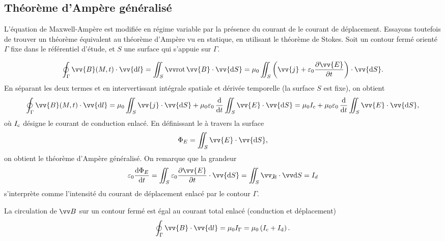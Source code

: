 \documentclass[12pt,fancy]{cours}
\begin{document}
\subsection{Théorème d'Ampère généralisé}
\label{subsubsec:ampère_généralisé}
L'équation de Maxwell-Ampère est modifiée en régime variable par la présence du courant de le courant de déplacement. Essayons toutefois de trouver un théorème équivalent au théorème d'Ampère vu en statique, en utilisant le théorème de Stokes. Soit un contour fermé orienté $\Gamma$ fixe dans le référentiel d'étude, et $S$ une surface qui s'appuie sur $\Gamma$.

\begin{equation}
\oint_{\Gamma}\vv{B}(M,t)\cdot\vv{\d l}=\iint_{S}\rot{\vv{B}}\cdot\vv{\d S}=\mu_0\iint_{S}\left(\vv{j}+\varepsilon_0\frac{\partial \vv{E}}{\partial t}\right)\cdot\vv{\d S}.
\end{equation}
En séparant les deux termes et en intervertissant intégrale spatiale et dérivée temporelle (la surface $S$ est fixe), on obtient
\begin{equation}
  \oint_{\Gamma}\vv{B}(M,t)\cdot\vv{\d l} = \mu_0\iint_{S}\vv{j}\cdot\vv{\d S}+\mu_0\varepsilon_0\,\frac{\d}{\d t}\iint_{S}\vv{E}\cdot\vv{\d S} =  \mu_0 I_{\rm c} +\mu_0\varepsilon_0\,\frac{\d}{\d t}\iint_{S}\vv{E}\cdot\vv{\d S},
\end{equation}
où $I_{\rm c}$ désigne le courant de conduction enlacé.
En définissant le  à travers la surface
\begin{equation}
\Phi_E=\iint_{S}\vv{E}\cdot\vv{\d S},
\end{equation}
on obtient le théorème d'Ampère généralisé. On remarque que la grandeur
\begin{equation}
\varepsilon_0\frac{\d \Phi_{E}}{\d t} =  \iint_{S}\varepsilon_0\dr{\vv{E}}{t}\cdot\vv{\d S} = \iint_S \jd \ps \dS = I_{d}
\end{equation}
s'interprète comme l'intensité du courant de déplacement enlacé par le contour $\Gamma$.
\begin{theorem}\label{form:}
  La circulation de $\B$ sur un contour fermé est égal au courant total enlacé (conduction et déplacement)
$$
  \oint_{\Gamma}\vv{B}\cdot\vv{\d l}=\mu_0 I_{\Gamma} = \mu_0\left(I_{\rm{c}}+I_{\rm d}\right).
$$
\end{theorem}
\noindent
\end{document}
